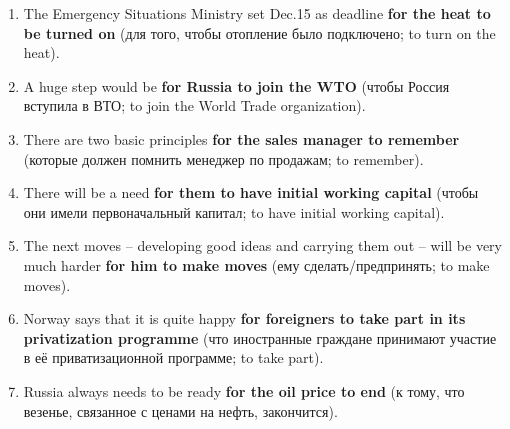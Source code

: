 \documentclass[main.tex]{subfiles}
\begin{document}
\begin{enumerate}[nosep,leftmargin=*]
	\itemsep\eitsp
	\item The Emergency Situations Ministry set Dec.15 as deadline \textbf{for the heat to be turned on} (для того, чтобы отопление было подключено; to turn on the heat).
	\item A huge step would be \textbf{for Russia to join the WTO} (чтобы Россия вступила в ВТО; to join the World Trade organization).
	\item There are two basic principles \textbf{for the sales manager to remember} (которые должен помнить менеджер по продажам; to remember).
	\item There will be a need \textbf{for them to have initial working capital} (чтобы они имели первоначальный капитал; to have initial working capital).
	\item The next moves -- developing good ideas and carrying them out -- will be very much harder \textbf{for him to make moves} (ему сделать/предпринять; to make moves).
	\item Norway says that it is quite happy \textbf{for foreigners to take part in its privatization programme} (что иностранные граждане принимают участие в её приватизационной программе; to take part).
	\item Russia always needs to be ready \textbf{for the oil price to end} (к тому, что везенье, связанное с ценами на нефть, закончится).
\end{enumerate}


\newpage
\setcounter{subsection}{10}

\end{document}
